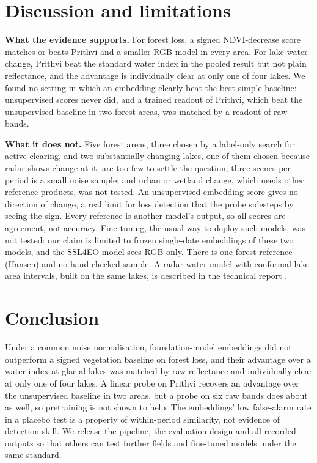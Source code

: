 \documentclass[11pt]{article}
\begin{document}
\section{Discussion and limitations}

\textbf{What the evidence supports.} For forest loss, a signed NDVI-decrease score matches or beats Prithvi and a smaller RGB model in every area. For lake water change, Prithvi beat the standard water index in the pooled result but not plain reflectance, and the advantage is individually clear at only one of four lakes. We found no setting in which an embedding clearly beat the best simple baseline: unsupervised scores never did, and a trained readout of Prithvi, which beat the unsupervised baseline in two forest areas, was matched by a readout of raw bands.

\textbf{What it does not.} Five forest areas, three chosen by a label-only search for active clearing, and two substantially changing lakes, one of them chosen because radar shows change at it, are too few to settle the question; three scenes per period is a small noise sample; and urban or wetland change, which needs other reference products, was not tested. An unsupervised embedding score gives no direction of change, a real limit for loss detection that the probe sidesteps by seeing the sign. Every reference is another model's output, so all scores are agreement, not accuracy. Fine-tuning, the usual way to deploy such models, was not tested: our claim is limited to frozen single-date embeddings of these two models, and the SSL4EO model sees RGB only. There is one forest reference (Hansen) and no hand-checked sample. A radar water model with conformal lake-area intervals, built on the same lakes, is described in the technical report \cite{habitatshift2026}.

\section{Conclusion}

Under a common noise normalisation, foundation-model embeddings did not outperform a signed vegetation baseline on forest loss, and their advantage over a water index at glacial lakes was matched by raw reflectance and individually clear at only one of four lakes. A linear probe on Prithvi recovers an advantage over the unsupervised baseline in two areas, but a probe on six raw bands does about as well, so pretraining is not shown to help. The embeddings' low false-alarm rate in a placebo test is a property of within-period similarity, not evidence of detection skill. We release the pipeline, the evaluation design and all recorded outputs so that others can test further fields and fine-tuned models under the same standard.
\end{document}
